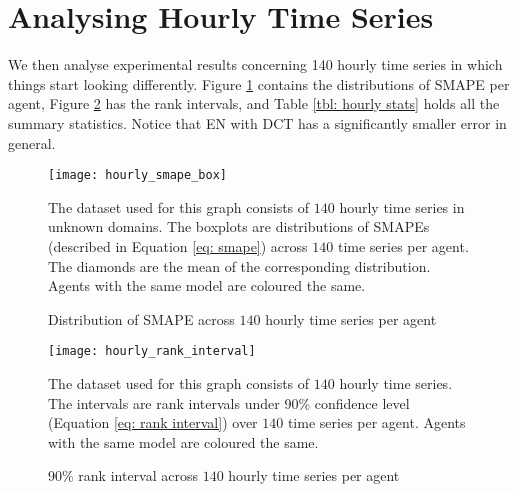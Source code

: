 \section{Analysing Hourly Time Series}
We then analyse experimental results concerning 140 hourly time series in which things start looking differently. Figure \ref{fig: hourly smape box} contains the distributions of SMAPE per agent, Figure \ref{fig: hourly rank interval} has the rank intervals, and Table \ref{tbl: hourly stats} holds all the summary statistics. Notice that EN with DCT has a significantly smaller error in general.
\begin{figure}[H]
    \centering
    \texttt{[image: hourly\_smape\_box]}
    \caption{Distribution of SMAPE across $140$ hourly time series per agent}
    {\raggedright \footnotesize The dataset used for this graph consists of $140$ hourly time series in unknown domains. The boxplots are distributions of SMAPEs (described in Equation \ref{eq: smape}) across $140$ time series per agent. The diamonds are the mean of the corresponding distribution. Agents with the same model are coloured the same. \par}
    \label{fig: hourly smape box}
\end{figure}
\begin{figure}[H]
    \centering
    \texttt{[image: hourly\_rank\_interval]}
    \caption{90\% rank interval across $140$ hourly time series per agent}
    {\raggedright \footnotesize The dataset used for this graph consists of $140$ hourly time series. The intervals are rank intervals under 90\% confidence level (Equation \ref{eq: rank interval}) over $140$ time series per agent. Agents with the same model are coloured the same. \par}
    \label{fig: hourly rank interval}
\end{figure}

